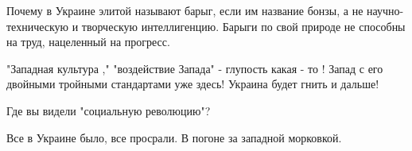\begin{itemize}
Почему в Украине элитой называют барыг, если им название бонзы, а не научно-техническую и творческую интеллигенцию. Барыги по свой природе не способны на труд, нацеленный на прогресс.

 
"Западная культура ," "воздействие Запада" - глупость какая - то ! Запад с его двойными тройными стандартами уже здесь! Украина будет гнить и дальше!

 
Где вы видели "социальную революцию"?

 
Все в Украине было, все просрали. В погоне за западной морковкой.

\end{itemize}

